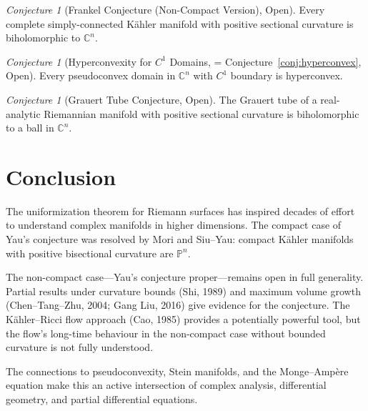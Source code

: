 \documentclass[12pt,a4paper]{amsart}
\theoremstyle{definition}
\theoremstyle{remark}
\newtheorem{conjecture}[theorem]{Conjecture}
\newcommand{\CC}{\mathbb{C}}
\newcommand{\PP}{\mathbb{P}}
\begin{document}
\begin{conjecture}[Frankel Conjecture (Non-Compact Version), Open]
Every complete simply-connected Kähler manifold with positive sectional
curvature is biholomorphic to $\CC^n$.
\end{conjecture}

\begin{conjecture}[Hyperconvexity for $C^1$ Domains,
= Conjecture~\ref{conj:hyperconvex}, Open]
Every pseudoconvex domain in $\CC^n$ with $C^1$ boundary is hyperconvex.
\end{conjecture}

\begin{conjecture}[Grauert Tube Conjecture, Open]
The Grauert tube of a real-analytic Riemannian manifold with positive
sectional curvature is biholomorphic to a ball in $\CC^n$.
\end{conjecture}

\section{Conclusion}

The uniformization theorem for Riemann surfaces has inspired decades of
effort to understand complex manifolds in higher dimensions.  The compact
case of Yau's conjecture was resolved by Mori and Siu--Yau: compact Kähler
manifolds with positive bisectional curvature are $\PP^n$.

The non-compact case---Yau's conjecture proper---remains open in full
generality.  Partial results under curvature bounds (Shi, 1989) and
maximum volume growth (Chen--Tang--Zhu, 2004; Gang Liu, 2016) give evidence
for the conjecture.  The Kähler--Ricci flow approach (Cao, 1985) provides a
potentially powerful tool, but the flow's long-time behaviour in the
non-compact case without bounded curvature is not fully understood.

The connections to pseudoconvexity, Stein manifolds, and the Monge--Ampère
equation make this an active intersection of complex analysis, differential
geometry, and partial differential equations.
\end{document}
